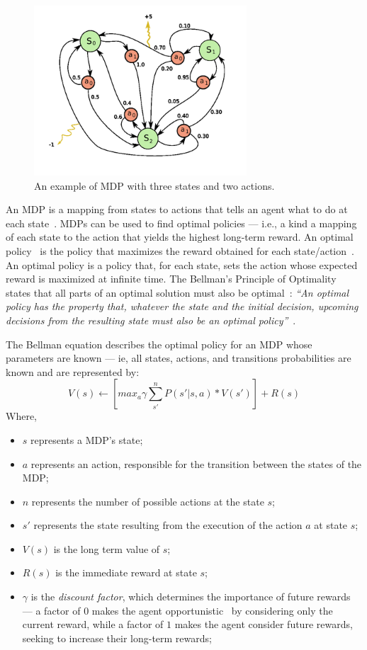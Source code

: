 \begin{figure}
\centering
\includegraphics[width=300px]{images/mdp}
\caption{An example of MDP with three states and two actions.}
\label{fig:mdp}
\end{figure}

An MDP is a mapping from states to actions that tells an agent what to do at each state~\cite{bellman1957dynamic,dreyfus2002richard}.
MDPs can be used to find optimal policies --- i.e., a kind a mapping of each state to the action that yields the highest long-term reward.
An optimal policy~\cite{morin1982monotonicity, mitten1964composition} is the policy that 
maximizes the reward obtained for each state/action~\cite{guelpeli2003utilizaccao}.
An optimal policy is a policy that, for each state, sets the action whose expected reward is maximized at infinite time.
The Bellman's Principle of Optimality states that 
all parts of an optimal solution must also be optimal~\cite{morin1982monotonicity}:
\textit{
``An optimal policy has the property that, whatever the state and the initial decision,
upcoming decisions from the resulting state must also be an optimal policy''}~\cite[p. 83]{bellman1957dynamic}.

The Bellman equation describes the optimal policy for an MDP whose parameters are known 
--- ie, all states, actions, and transitions probabilities are known and are represented by:
\[
	V(s) \leftarrow \left[max_a \gamma \sum_{s'}^n P(s'|s,a) * V(s')\right] + R(s)
\]
Where,
\begin{itemize}
\item $s$ represents a MDP's state;
\item $a$ represents an action, responsible for the transition between the states of the MDP;
\item $n$ represents the number of possible actions at the state $s$;
\item $s'$ represents the state resulting from the execution of the action $a$ at state $s$;
\item $V(s)$ is the long term value of $s$;
\item $R(s)$ is the immediate reward at state $s$;
\item $\gamma$ is the \textit{discount factor}, which determines the importance of future rewards --- a factor of $0$ makes the agent opportunistic~\cite{schweighofer2003meta} by considering only the current reward, while a factor of $1$ makes the agent consider future rewards, seeking to increase their long-term rewards;
\end{itemize}

